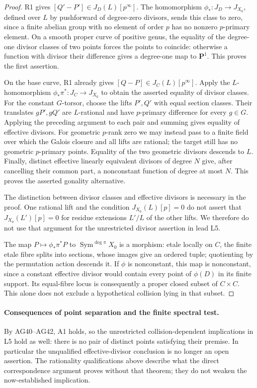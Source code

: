 \begin{proof}
R1 gives $[Q'-P']\in J_D(L)[p^\infty]$. The homomorphism
$\phi_*:J_D\to J_{X_0}$, defined over $L$ by pushforward of
degree-zero divisors, sends this class to zero, since a finite
abelian group with no element of order $p$ has no nonzero
$p$-primary element. On a smooth proper curve of positive genus,
the equality of the degree-one divisor classes of two points
forces the points to coincide: otherwise a function with divisor
their difference gives a degree-one map to $\mathbf P^1$.
This proves the first assertion.

On the base curve, R1 already gives $[Q-P]\in J_C(L)[p^\infty]$.
Apply the $L$-homomorphism $\phi_*\pi^*:J_C\to J_{X_0}$ to
obtain the asserted equality of divisor classes. For the constant
$G$-torsor, choose the lifts $P',Q'$ with equal section classes.
Their translates $gP',gQ'$ are $L$-rational and have $p$-primary
difference for every $g\in G$. Applying the preceding argument
to each pair and summing gives equality of effective divisors.
For geometric $p$-rank zero we may instead pass to a finite field
over which the Galois closure and all lifts are rational; the
target still has no geometric $p$-primary points. Equality of
the two geometric divisors descends to $L$.
Finally, distinct effective linearly equivalent divisors of degree
$N$ give, after cancelling their common part, a nonconstant function
of degree at most $N$. This proves the asserted gonality alternative.

The distinction between divisor classes and effective divisors
is necessary in the proof. One rational lift and the condition
$J_{X_0}(L)[p]=0$ do not assert that
$J_{X_0}(L')[p]=0$ for residue extensions $L'/L$ of the other
lifts. We therefore do not use that argument for the unrestricted
divisor assertion in lead L5.

The map $P\mapsto\phi_*\pi^*P$ to $\operatorname{Sym}^{\deg\pi}X_0$
is a morphism: etale locally on $C$, the finite etale fibre splits
into sections, whose images give an ordered tuple; quotienting by
the permutation action descends it. If $\phi$ is nonconstant, this
map is nonconstant, since a constant effective divisor would contain
every point of $\phi(D)$ in its finite support. Its equal-fibre locus
is consequently a proper closed subset of $C\times C$. This alone
does not exclude a hypothetical collision lying in that subset.
\end{proof}

\paragraph{Consequences of point separation and the finite spectral test.}
By AG40--AG42, A1 holds, so the unrestricted collision-dependent
implications in L5 hold as well: there is no pair of distinct
points satisfying their premise. In particular the unqualified
effective-divisor conclusion is no longer an open assertion.
The rationality qualifications above describe what the direct
correspondence argument proves without that theorem; they do
not weaken the now-established implication.

